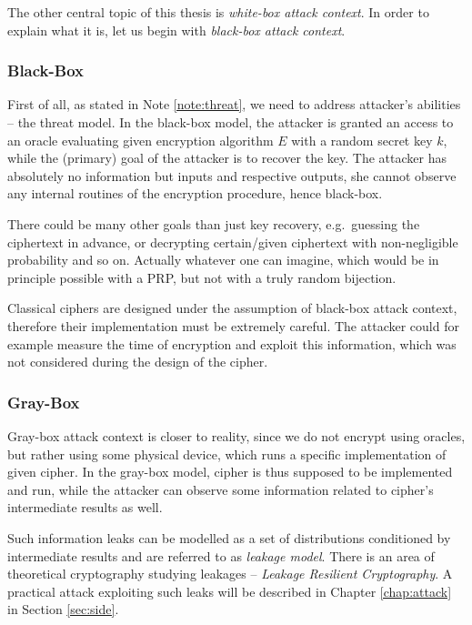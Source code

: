 The other central topic of this thesis is {\em white-box attack context}. In order to explain what it is, let us begin with {\em black-box attack context}.

\subsubsection{Black-Box}

First of all, as stated in Note \ref{note:threat}, we need to address attacker's abilities -- the threat model. In the black-box model, the attacker is granted an access to an oracle evaluating given encryption algorithm $E$ with a random secret key $k$, while the (primary) goal of the attacker is to recover the key. The attacker has absolutely no information but inputs and respective outputs, she cannot observe any internal routines of the encryption procedure, hence black-box.

\begin{note}
	There could be many other goals than just key recovery, e.g.\ guessing the ciphertext in advance, or decrypting certain/given ciphertext with non-negligible probability and so on. Actually whatever one can imagine, which would be in principle possible with a PRP, but not with a truly random bijection.
\end{note}

Classical ciphers are designed under the assumption of black-box attack context, therefore their implementation must be extremely careful. The attacker could for example measure the time of encryption and exploit this information, which was not considered during the design of the cipher.

\subsubsection{Gray-Box}

Gray-box attack context is closer to reality, since we do not encrypt using oracles, but rather using some physical device, which runs a specific implementation of given cipher. In the gray-box model, cipher is thus supposed to be implemented and run, while the attacker can observe some information related to cipher's intermediate results as well.

Such information leaks can be modelled as a set of distributions conditioned by intermediate results and are referred to as {\em leakage model}. There is an area of theoretical cryptography studying leakages -- {\em Leakage Resilient Cryptography}. A practical attack exploiting such leaks will be described in Chapter \ref{chap:attack} in Section \ref{sec:side}.   %

